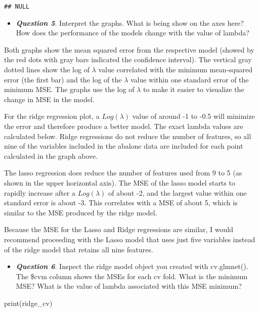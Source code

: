 \documentclass[
]{article}
\newenvironment{Shaded}{\begin{snugshade}}{\end{snugshade}}
\newcommand{\FunctionTok}[1]{\textcolor[rgb]{0.00,0.00,0.00}{#1}}
\newcommand{\NormalTok}[1]{#1}
\providecommand{\tightlist}{%
  \setlength{\itemsep}{0pt}\setlength{\parskip}{0pt}}
\begin{document}
\begin{verbatim}
## NULL
\end{verbatim}

\begin{itemize}
\tightlist
\item
  \textbf{\emph{Question 5}}. Interpret the graphs. What is being show
  on the axes here? How does the performance of the models change with
  the value of lambda?
\end{itemize}

Both graphs show the mean squared error from the respective model
(showed by the red dots with gray bars indicated the confidence
interval). The vertical gray dotted lines show the log of \(\lambda\)
value correlated with the minimum mean-squared error (the first bar) and
the log of the \(\lambda\) value within one standard error of the
minimum MSE. The graphs use the log of \(\lambda\) to make it easier to
visualize the change in MSE in the model.

For the ridge regression plot, a \(Log(\lambda)\) value of around -1 to
-0.5 will minimize the error and therefore produce a better model. The
exact lambda values are calculated below. Ridge regressions do not
reduce the number of features, so all nine of the variables included in
the abalone data are included for each point calculated in the graph
above.

The lasso regression does reduce the number of features used from 9 to 5
(as shown in the upper horizontal axis). The MSE of the lasso model
starts to rapidly increase after a \(Log(\lambda)\) of about -2, and the
largest value within one standard error is about -3. This correlates
with a MSE of about 5, which is similar to the MSE produced by the ridge
model.

Because the MSE for the Lasso and Ridge regressions are similar, I would
recommend proceeding with the Lasso model that uses just five variables
instead of the ridge model that retains all nine features.

\begin{itemize}
\tightlist
\item
  \textbf{\emph{Question 6}}. Inspect the ridge model object you created
  with cv.glmnet(). The \$cvm column shows the MSEs for each cv fold.
  What is the minimum MSE? What is the value of lambda associated with
  this MSE minimum?
\end{itemize}

\begin{Shaded}
\begin{Highlighting}[]
\FunctionTok{print}\NormalTok{(ridge\_cv)}
\end{Highlighting}
\end{Shaded}
\end{document}

